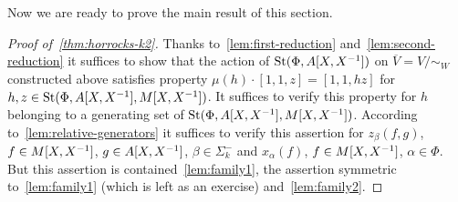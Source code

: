 Now we are ready to prove the main result of this section.
\begin{proof}[Proof of~\cref{thm:horrocks-k2}]
    Thanks to~\cref{lem:first-reduction} and~\cref{lem:second-reduction} it suffices to show that the action of
    $\operatorname{St}(\Phi, A[X, X^{-1}])$ on $\overline{V} = V/\sim_W$ constructed above satisfies property
    $\mu(h) \cdot [1, 1, z] = [1, 1, hz]$ for $h, z \in \operatorname{St}(\Phi, A[X, X^{-1}], M[X, X^{-1}])$.
    It suffices to verify this property for $h$ belonging to a generating set of $\operatorname{St}(\Phi, A[X, X^{-1}], M[X, X^{-1}])$.
    According to~\cref{lem:relative-generators} it suffices to verify this assertion for
    $z_{\beta}(f, g)$, $f \in M[X, X^{-1}]$, $g \in A[X, X^{-1}]$, $\beta \in \Sigma_k^-$ and
    $x_\alpha(f)$, $f \in M[X, X^{-1}]$, $\alpha \in \Phi$.
    But this assertion is contained~\cref{lem:family1}, the assertion symmetric to~\cref{lem:family1} (which is left as an exercise) and~\cref{lem:family2}.
\end{proof}


